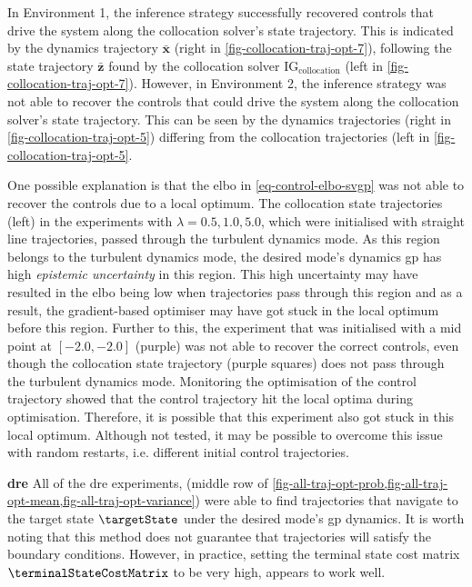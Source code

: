\documentclass{mimosis-class/mimosis}
\numberwithin{equation}{chapter}
\begin{document}
{In Environment 1, the inference strategy successfully recovered controls that
drive the system along the collocation solver's state trajectory.
This is indicated by the dynamics trajectory \(\bar{\mathbf{x}}\) (right in \cref{fig-collocation-traj-opt-7}),
following the state trajectory \(\bar{\mathbf{z}}\) found by the collocation solver
\(\text{IG}_{\text{collocation}}\) (left in \cref{fig-collocation-traj-opt-7}).
However, in Environment 2, the inference strategy was not able to recover the controls that could drive the system
along the collocation solver's state trajectory.
This can be seen by the dynamics trajectories (right in \cref{fig-collocation-traj-opt-5})
differing from the collocation trajectories (left in \cref{fig-collocation-traj-opt-5}.

One possible explanation is that the \acrshort{elbo} in \cref{eq-control-elbo-svgp} was not able
to recover the controls due to a local optimum.
The collocation state trajectories (left) in the experiments with \(\lambda=0.5, 1.0, 5.0\), which were initialised
with straight line trajectories, passed through the turbulent dynamics mode.
As this region belongs to the turbulent dynamics mode, the desired mode's dynamics \acrshort{gp} has high \emph{epistemic uncertainty}
in this region.
This high uncertainty may have resulted in the \acrshort{elbo} being low when trajectories pass through this region and
as a result, the gradient-based optimiser may have got stuck in the local optimum before this region.
Further to this, the experiment that was initialised with a mid point at \([-2.0, -2.0]\) (purple)
was not able to recover the correct controls, even though the collocation state trajectory (purple squares)
does not pass through the turbulent dynamics mode.
Monitoring the optimisation of the control trajectory showed that the control trajectory
hit the local optima during optimisation.
Therefore, it is possible that this experiment also got stuck in this local optimum.
Although not tested, it may be possible to overcome this issue with random restarts, i.e. different initial
control trajectories.

\textbf{\acrfull{dre}}
All of the \acrshort{dre} experiments, (middle row of
\cref{fig-all-traj-opt-prob,fig-all-traj-opt-mean,fig-all-traj-opt-variance})
were able to find trajectories
that navigate to the target state \(\targetState\) under the desired mode's \acrshort{gp} dynamics.
It is worth noting that this method does not guarantee that trajectories will satisfy the boundary conditions.
However, in practice, setting the terminal state cost matrix \(\terminalStateCostMatrix\) to be very high,
appears to work well.

}
\end{document}
